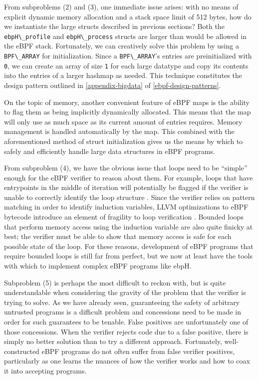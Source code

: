 \documentclass[
  12pt]{findlay}
\newcommand{\passthrough}[1]{#1}
\begin{document}
From subproblems (2) and (3), one immediate issue arises: with no means
of explicit dynamic memory allocation and a stack space limit of 512
bytes, how do we instantiate the large structs described in previous
sections? Both the \passthrough{\lstinline!ebpH\_profile!} and
\passthrough{\lstinline!ebpH\_process!} structs are larger than would be
allowed in the eBPF stack. Fortunately, we can creatively solve this
problem by using a \passthrough{\lstinline!BPF\_ARRAY!} for
initialization. Since a \passthrough{\lstinline!BPF\_ARRAY!}'s entries
are preinitialized with \passthrough{\lstinline!0!}, we can create an
array of size \passthrough{\lstinline!1!} for each large datatype and
copy its contents into the entries of a larger hashmap as needed. This
technique constitutes the design pattern outlined in
\autoref{appendix-bigdata} of \autoref{ebpf-design-patterns}.

On the topic of memory, another convenient feature of eBPF maps is the
ability to flag them as being implicitly dynamically allocated. This
means that the map will only use as much space as its current amount of
entries requires. Memory management is handled automatically by the map.
This combined with the aforementioned method of struct initialization
gives us the means by which to safely and efficiently handle large data
structures in eBPF programs.

From subproblem (4), we have the obvious issue that loops need to be
``simple'' enough for the eBPF verifier to reason about them. For
example, loops that have entrypoints in the middle of iteration will
potentially be flagged if the verifier is unable to correctly identify
the loop structure \autocite{corbet18}. Since the verifier relies on
pattern matching in order to identify induction variables, LLVM
optimizations to eBPF bytecode introduce an element of fragility to loop
verification \autocite{corbet18}. Bounded loops that perform memory
access using the induction variable are also quite finicky at best; the
verifier must be able to show that memory access is safe for each
possible state of the loop. For these reasons, development of eBPF
programs that require bounded loops is still far from perfect, but we
now at least have the tools with which to implement complex eBPF
programs like ebpH.

Subproblem (5) is perhaps the most difficult to reckon with, but is
quite understandable when considering the gravity of the problem that
the verifier is trying to solve. As we have already seen, guaranteeing
the safety of arbitrary untrusted programs is a difficult problem and
concessions need to be made in order for such guarantees to be tenable.
False positives are unfortunately one of those concessions. When the
verifier rejects code due to a false positive, there is simply no better
solution than to try a different approach. Fortunately, well-constructed
eBPF programs do not often suffer from false verifier positives,
particularly as one learns the nuances of how the verifier works and how
to coax it into accepting programs.
\end{document}
